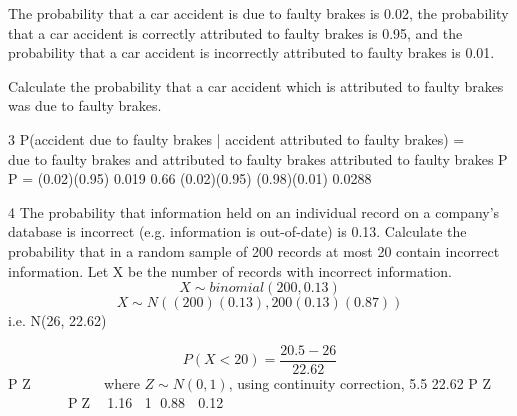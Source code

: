 \documentclass[a4paper,12pt]{article}
\begin{document}
 The probability that a car accident is due to faulty brakes is 0.02, the probability that a
car accident is correctly attributed to faulty brakes is 0.95, and the probability that a car accident is incorrectly attributed to faulty brakes is 0.01.

Calculate the probability that a car accident which is attributed to faulty brakes was
due to faulty brakes. 

3 P(accident due to faulty brakes | accident attributed to faulty brakes)
=  
 
due to faulty brakes and attributed to faulty brakes
attributed to faulty brakes
P
P
= (0.02)(0.95) 0.019 0.66
(0.02)(0.95) (0.98)(0.01) 0.0288
 


\newpage 

4 The probability that information held on an individual record on a company's
database is incorrect (e.g. information is out-of-date) is 0.13.
Calculate the probability that in a random sample of 200 records at most 20 contain
incorrect information.
 Let X be the number of records with incorrect information.
\[X \sim binomial(200, 0.13)\]
\[X \sim  N((200)(0.13), 200(0.13)(0.87)) \]
i.e. N(26, 22.62)

\[ P(X < 20) = \frac{20.5 - 26}{22.62}\]
P Z
  
   
 	
where $Z \sim N(0,1)$, using continuity correction,
5.5
22.62
P Z
  
   
 	
 PZ  1.16 1 0.88  0.12
\end{document}
